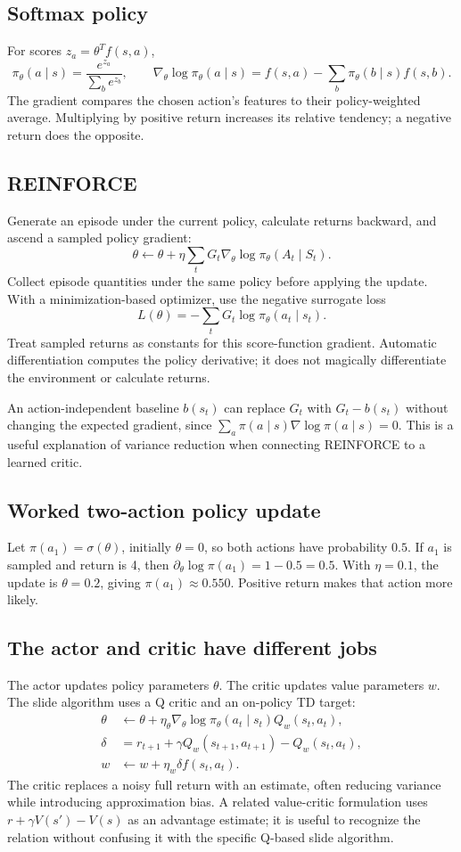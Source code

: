 \documentclass[11pt]{article}
\begin{document}
\subsection{Softmax policy}
For scores $z_a=\theta^Tf(s,a)$,
\[
\pi_\theta(a\mid s)=\frac{e^{z_a}}{\sum_be^{z_b}},\qquad
\nabla_\theta\log\pi_\theta(a\mid s)
=f(s,a)-\sum_b\pi_\theta(b\mid s)f(s,b).
\]
The gradient compares the chosen action's features to their policy-weighted average. Multiplying by positive return increases its relative tendency; a negative return does the opposite.
\subsection{REINFORCE}
Generate an episode under the current policy, calculate returns backward, and ascend a sampled policy gradient:
\[
\theta\leftarrow\theta+\eta\sum_tG_t\nabla_\theta\log\pi_\theta(A_t\mid S_t).
\]
Collect episode quantities under the same policy before applying the update. With a minimization-based optimizer, use the negative surrogate loss
\[
L(\theta)=-\sum_tG_t\log\pi_\theta(a_t\mid s_t).
\]
Treat sampled returns as constants for this score-function gradient. Automatic differentiation computes the policy derivative; it does not magically differentiate the environment or calculate returns.

An action-independent baseline $b(s_t)$ can replace $G_t$ with $G_t-b(s_t)$ without changing the expected gradient, since $\sum_a\pi(a\mid s)\nabla\log\pi(a\mid s)=0$. This is a useful explanation of variance reduction when connecting REINFORCE to a learned critic.
\subsection{Worked two-action policy update}
Let $\pi(a_1)=\sigma(\theta)$, initially $\theta=0$, so both actions have probability $0.5$. If $a_1$ is sampled and return is 4, then $\partial_\theta\log\pi(a_1)=1-0.5=0.5$. With $\eta=0.1$, the update is $\theta=0.2$, giving $\pi(a_1)\approx0.550$. Positive return makes that action more likely.
\subsection{The actor and critic have different jobs}
The actor updates policy parameters $\theta$. The critic updates value parameters $w$. The slide algorithm uses a Q critic and an on-policy TD target:
\begin{align*}
\theta&\leftarrow\theta+\eta_\theta\nabla_\theta\log\pi_\theta(a_t\mid s_t)Q_w(s_t,a_t),\\
\delta&=r_{t+1}+\gamma Q_w(s_{t+1},a_{t+1})-Q_w(s_t,a_t),\\
w&\leftarrow w+\eta_w\delta f(s_t,a_t).
\end{align*}
The critic replaces a noisy full return with an estimate, often reducing variance while introducing approximation bias. A related value-critic formulation uses $r+\gamma V(s')-V(s)$ as an advantage estimate; it is useful to recognize the relation without confusing it with the specific Q-based slide algorithm.
\end{document}
